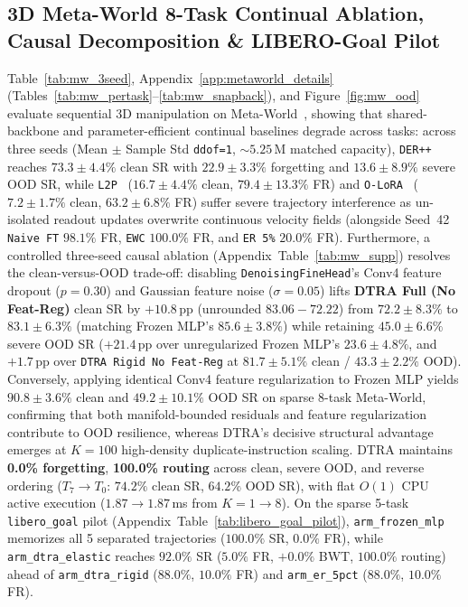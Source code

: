 \documentclass[10pt]{article}
\begin{document}
\subsection{3D Meta-World 8-Task Continual Ablation, Causal Decomposition \& LIBERO-Goal Pilot}
Table~\ref{tab:mw_3seed}, Appendix~\ref{app:metaworld_details} (Tables~\ref{tab:mw_pertask}--\ref{tab:mw_snapback}), and Figure~\ref{fig:mw_ood} evaluate sequential 3D manipulation on Meta-World~\cite{yu2020metaworld}, showing that shared-backbone and parameter-efficient continual baselines degrade across tasks: across three seeds (Mean $\pm$ Sample Std \texttt{ddof=1}, $\sim 5.25\,$M matched capacity), \texttt{DER++}~\cite{buzzega2020der} reaches $73.3 \pm 4.4\%$ clean SR with $22.9 \pm 3.3\%$ forgetting and $13.6 \pm 8.9\%$ severe OOD SR, while \texttt{L2P}~\cite{wang2022l2p} ($16.7 \pm 4.4\%$ clean, $79.4 \pm 13.3\%$ FR) and \texttt{O-LoRA}~\cite{wang2023olora} ($7.2 \pm 1.7\%$ clean, $63.2 \pm 6.8\%$ FR) suffer severe trajectory interference as un-isolated readout updates overwrite continuous velocity fields (alongside Seed~42 \texttt{Naive FT} $98.1\%$ FR, \texttt{EWC} $100.0\%$ FR, and \texttt{ER 5\%} $20.0\%$ FR). Furthermore, a controlled three-seed causal ablation (Appendix~Table~\ref{tab:mw_supp}) resolves the clean-versus-OOD trade-off: disabling \texttt{DenoisingFineHead}'s Conv4 feature dropout ($p=0.30$) and Gaussian feature noise ($\sigma=0.05$) lifts \textbf{DTRA Full (No Feat-Reg)} clean SR by $+10.8\,$pp (unrounded $83.06 - 72.22$) from $72.2 \pm 8.3\%$ to $\mathbf{83.1 \pm 6.3}\%$ (matching Frozen MLP's $85.6 \pm 3.8\%$) while retaining $\mathbf{45.0 \pm 6.6}\%$ severe OOD SR ($+21.4\,$pp over unregularized Frozen MLP's $23.6 \pm 4.8\%$, and $+1.7\,$pp over \texttt{DTRA Rigid No Feat-Reg} at $81.7 \pm 5.1\%$ clean / $43.3 \pm 2.2\%$ OOD). Conversely, applying identical Conv4 feature regularization to Frozen MLP yields $90.8 \pm 3.6\%$ clean and $49.2 \pm 10.1\%$ OOD SR on sparse $8$-task Meta-World, confirming that both manifold-bounded residuals and feature regularization contribute to OOD resilience, whereas DTRA's decisive structural advantage emerges at $K=100$ high-density duplicate-instruction scaling. DTRA maintains \textbf{0.0\% forgetting}, \textbf{100.0\% routing} across clean, severe OOD, and reverse ordering ($T_7 \to T_0$: $74.2\%$ clean SR, $64.2\%$ OOD SR), with flat $O(1)$ CPU active execution ($1.87 \to 1.87\,$ms from $K=1 \to 8$). On the sparse 5-task \texttt{libero\_goal} pilot (Appendix~Table~\ref{tab:libero_goal_pilot}), \texttt{arm\_frozen\_mlp} memorizes all 5 separated trajectories ($100.0\%$ SR, $0.0\%$ FR), while \texttt{arm\_dtra\_elastic} reaches $92.0\%$ SR ($5.0\%$ FR, $+0.0\%$ BWT, $100.0\%$ routing) ahead of \texttt{arm\_dtra\_rigid} ($88.0\%$, $10.0\%$ FR) and \texttt{arm\_er\_5pct} ($88.0\%$, $10.0\%$ FR).
\end{document}
